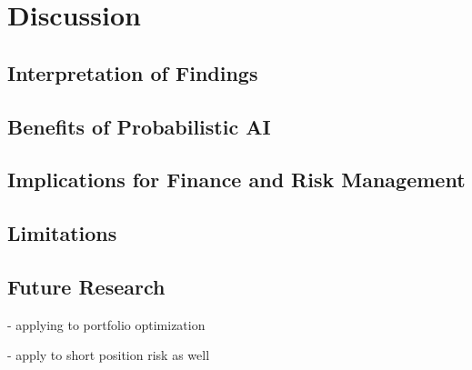 \section{Discussion} 
\label{sec:7_discussion}


\subsection{Interpretation of Findings}
\label{sec:interpretation_of_findings}

\subsection{Benefits of Probabilistic AI}
\label{sec:benefits_of_probabilistic_ai}

\subsection{Implications for Finance and Risk Management}
\label{sec:implications_for_finance_and_risk_management}

\subsection{Limitations}
\label{sec:limitations}

\subsection{Future Research}
\label{sec:future_research}

 - applying to portfolio optimization

 - apply to short position risk as well